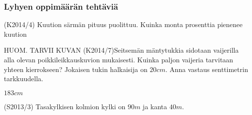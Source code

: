 



\subsubsection*{Lyhyen oppimäärän tehtäviä}


\begin{tehtava}
	(K2014/4)  Kuution särmän pituus puolittuu. Kuinka monta prosenttia pienenee kuution
	\begin{alakohdat}
\end{alakohdat}
						
						\begin{vastaus}
						\begin{alakohdat}
						\end{alakohdat}
						  
				\end{vastaus}
						\end{tehtava}
					
					
					
					
						
						


\begin{tehtava}
HUOM. TARVII KUVAN 
(K2014/7)Seitsemän mäntytukkia sidotaan vaijerilla alla olevan poikkileikkauskuvion mukaisesti. Kuinka paljon vaijeria tarvitaan yhteen kierrokseen? Jokaisen tukin halkaisija on $20 cm$.
Anna vastaus senttimetrin tarkkuudella. 

\begin{vastaus}
 $183 cm$
\end{vastaus}
\end{tehtava}

\begin{tehtava}(S2013/3) Tasakylkisen kolmion kylki on $90 m$ ja kanta $40 m$.
\begin{alakohdat}
 \end{alakohdat}
    \begin{vastaus}
    \begin{alakohdat}
	\alakohta{$26\circ$}
	\alakohta{$1755 m^2$}
   \end{alakohdat}
 \end{vastaus}
\end{tehtava}

